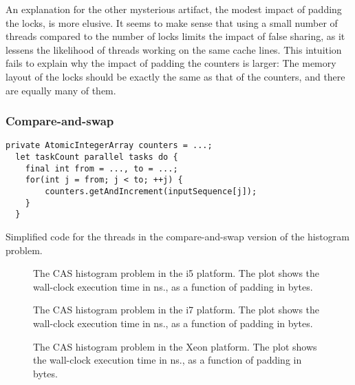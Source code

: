 An explanation for the other mysterious artifact, the modest impact of padding
the locks, is more elusive. It seems to make sense that using a small number of
threads compared to the number of locks limits the impact of false sharing, as
it lessens the likelihood of threads working on the same cache lines. This
intuition fails to explain why the impact of padding the counters is larger: The
memory layout of the locks should be exactly the same as that of the counters,
and there are equally many of them.




\subsubsection{Compare-and-swap}
\begin{code}
\begin{Verbatim}[frame=single]
  private AtomicIntegerArray counters = ...;
  let taskCount parallel tasks do {
    final int from = ..., to = ...;
    for(int j = from; j < to; ++j) {
        counters.getAndIncrement(inputSequence[j]);
    }
  }
\end{Verbatim}
	\caption{Simplified code for the threads in the compare-and-swap 
	version of the histogram problem.}
\end{code}


\begin{figure}[hbpt]
\graphicspath{{plots/}}

\caption{The CAS histogram problem in the i5 platform. The plot shows the
	wall-clock execution time in ns., as a function of padding in bytes.}
\label{fig:histo-cas-i5}
\end{figure}

\begin{figure}[hbpt]
\graphicspath{{plots/}}

\caption{The CAS histogram problem in the i7 platform. The plot shows the
	wall-clock execution time in ns., as a function of padding in bytes.}
	\label{fig:histo-cas-i7}
\end{figure}

\begin{figure}[hbpt]
\graphicspath{{plots/}}

\caption{The CAS histogram problem in the Xeon platform. The plot shows the
	wall-clock execution time in ns., as a function of padding in bytes.}
	\label{fig:histo-cas-xeon}
\end{figure}

